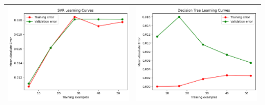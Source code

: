 \begin{table}[H]
    \centering
    \footnotesize
    \setlength\tabcolsep{0pt}
    \begin{tabularx}{\textwidth}{|X|X|}
        \hline
        \includegraphics[width=\linewidth, trim=0 0 0 0]{images/SVR_lc70_ridottoAzure.png} &
        \includegraphics[width=\linewidth, trim=0 0 0 0]{images/DecisionTree_lc70_ridottoAzure.png} \\
        \hline

\end{tabularx}
\end{table}
